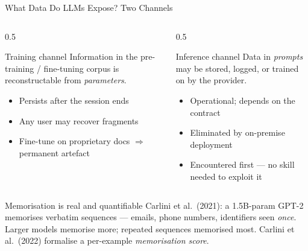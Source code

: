 \documentclass[9pt,t]{beamer}
\begin{document}
\begin{frame}{What Data Do LLMs Expose? Two Channels}
\begin{columns}[T]
\begin{column}{0.5\textwidth}
\begin{block}{Training channel}
Information in the pre-training / fine-tuning corpus is reconstructable from
\emph{parameters}.
\begin{itemize}
  \item Persists after the session ends
  \item Any user may recover fragments
  \item Fine-tune on proprietary docs $\Rightarrow$ permanent artefact
\end{itemize}
\end{block}
\end{column}
\begin{column}{0.5\textwidth}
\begin{block}{Inference channel}
Data in \emph{prompts} may be stored, logged, or trained on by the provider.
\begin{itemize}
  \item Operational; depends on the contract
  \item Eliminated by on-premise deployment
  \item Encountered first --- no skill needed to exploit it
\end{itemize}
\end{block}
\end{column}
\end{columns}

\medskip
\begin{alertblock}{Memorisation is real and quantifiable}
Carlini et al.\ (2021): a 1.5B-param GPT-2 memorises verbatim sequences --- emails,
phone numbers, identifiers seen \emph{once}. Larger models memorise more; repeated
sequences memorised most. Carlini et al.\ (2022) formalise a per-example
\emph{memorisation score}.
\end{alertblock}
\end{frame}
\end{document}
